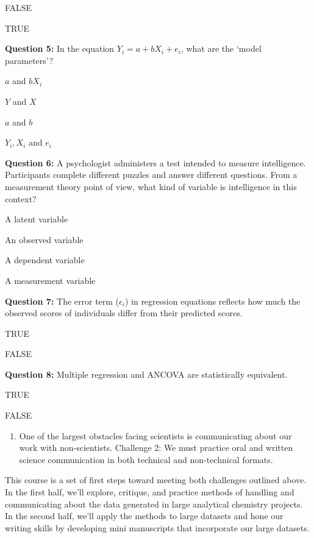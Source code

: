 \documentclass[
]{krantz}
\providecommand{\tightlist}{%
  \setlength{\itemsep}{0pt}\setlength{\parskip}{0pt}}
\begin{document}
FALSE

TRUE

\hypertarget{collapseExample4}{}
\hypertarget{answerFeedback4}{}

\textbf{Question 5:}
In the equation \(Y_i = a + bX_i + e_i\), what are the `model parameters'?

\(a\) and \(bX_i\)

\(Y\) and \(X\)

\(a\) and \(b\)

\(Y_i, X_i\) and \(e_i\)

\hypertarget{collapseExample5}{}
\hypertarget{answerFeedback5}{}

\textbf{Question 6:}
A psychologist administers a test intended to measure intelligence. Participants complete different puzzles and answer different questions. From a measurement theory point of view, what kind of variable is intelligence in this context?

A latent variable

An observed variable

A dependent variable

A measurement variable

\hypertarget{collapseExample6}{}
\hypertarget{answerFeedback6}{}

\textbf{Question 7:}
The error term (\(\epsilon_i\)) in regression equations reflects how much the observed scores of individuals differ from their predicted scores.

TRUE

FALSE

\hypertarget{collapseExample7}{}
\hypertarget{answerFeedback7}{}

\textbf{Question 8:}
Multiple regression and ANCOVA are statistically equivalent.

TRUE

FALSE

\hypertarget{collapseExample8}{}
\hypertarget{answerFeedback8}{}

\begin{enumerate}
\def\labelenumi{\arabic{enumi}.}
\setcounter{enumi}{1}
\tightlist
\item
  One of the largest obstacles facing scientists is communicating about our work with non-scientists. Challenge 2: We must practice oral and written science communication in both technical and non-technical formats.
\end{enumerate}

This course is a set of first steps toward meeting both challenges outlined above. In the first half, we'll explore, critique, and practice methods of handling and communicating about the data generated in large analytical chemistry projects. In the second half, we'll apply the methods to large datasets and hone our writing skills by developing mini manuscripts that incorporate our large datasets.
\end{document}
